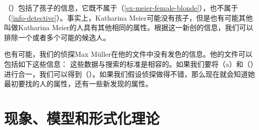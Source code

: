 \ea
{}
\z
（）包括了孩子的信息，它既不属于（\ref{ex-meier-female-blonde}），也不属于（\ref{info-detective}）。事实上，Katharina Meier可能没有孩子，但是也有可能其他叫做Katharina Meier的人具有其他相同的属性。根据这一新创的信息，我们可以排除一个或者多个可能的候选人。

也有可能，我们的侦探Max Müller在他的文件中没有发色的信息。他的文件可以包括如下这些信息：
\ea
{}
\z
这些数据与搜索的标准是相容的。如果我们要将（a）和（）进行合一，我们可以得到（）。如果我们假设侦探做得不错，那么现在就会知道她最初要找的人的属性，还有一些新发现的属性。

\section{现象、模型和形式化理论}
\label{sec-modelle-theorien}

